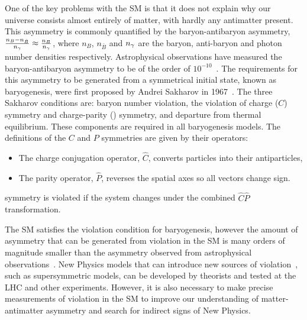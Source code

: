 One of the key problems with the SM is that it does not explain why our universe consists almost entirely of matter, with hardly any antimatter present. This asymmetry is commonly quantified by the baryon-antibaryon asymmetry, $\frac{n_{B} - n_{\bar{B}}}{n_{{\gamma}}} \approx \frac{n_{B}}{n_{{\gamma}}}$, where $n_{B}$, $n_{\bar{B}}$ and $n_{{\gamma}}$ are the baryon, anti-baryon and photon number densities respectively. Astrophysical observations have measured the baryon-antibaryon asymmetry to be of the order of $10^{-10}$~\cite{astrophysicalasy}. The requirements for this asymmetry to be generated from a symmetrical initial state, known as baryogenesis, were first proposed by Andrei Sakharov in 1967~\cite{sakharov}. The three Sakharov conditions are: baryon number violation, the violation of charge ($C$) symmetry and charge-parity (\CP) symmetry, and departure from thermal equilibrium. These components are required in all baryogenesis models. The definitions of the $C$ and $P$ symmetries are given by their operators:
\begin{itemize}
\item The charge conjugation operator, $\hat{C}$, converts particles into their antiparticles,
\item The parity operator, $\hat{P}$, reverses the spatial axes so all vectors change sign.
\end{itemize}
\CP symmetry is violated if the system changes under the combined $\hat{C}\hat{P}$ transformation.

The SM satisfies the \CP violation condition for baryogenesis, however the amount of asymmetry that can be generated from \CP violation in the SM is many orders of magnitude smaller than the asymmetry observed from astrophysical observations~\cite{SMasy}. New Physics models that can introduce new sources of \CP violation~\cite{BSMCP}, such as supersymmetric models, can be developed by theorists and tested at the LHC and other experiments. However, it is also necessary to make precise measurements of \CP violation in the SM to improve our understanding of matter-antimatter asymmetry and search for indirect signs of New Physics.

